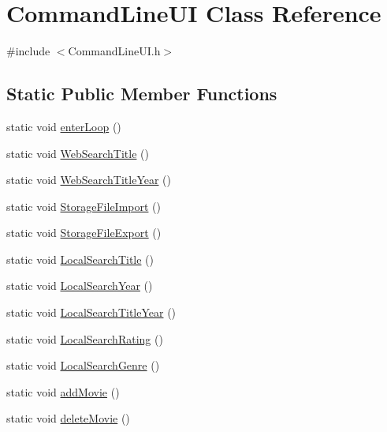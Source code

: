 \hypertarget{class_command_line_u_i}{}\section{Command\+Line\+UI Class Reference}
\label{class_command_line_u_i}


{\ttfamily \#include $<$Command\+Line\+U\+I.\+h$>$}

\subsection*{Static Public Member Functions}
\begin{DoxyCompactItemize}
\item 
static void \hyperlink{class_command_line_u_i_ac72a09121b78bdf1ab1f457795fcf370}{enter\+Loop} ()
\item 
static void \hyperlink{class_command_line_u_i_acddc1d1d643322aa7885e758d9ba0258}{Web\+Search\+Title} ()
\item 
static void \hyperlink{class_command_line_u_i_a9aadc77fe37d190f9a3931c7babac900}{Web\+Search\+Title\+Year} ()
\item 
static void \hyperlink{class_command_line_u_i_a572b2700a11b424ea09e0bc1664e1d01}{Storage\+File\+Import} ()
\item 
static void \hyperlink{class_command_line_u_i_aeec7ed7ef7e0529db92d63c72a2a411d}{Storage\+File\+Export} ()
\item 
static void \hyperlink{class_command_line_u_i_aee2e35a46b0e08c2d63e4e560a2ac42e}{Local\+Search\+Title} ()
\item 
static void \hyperlink{class_command_line_u_i_ab14668a760d1d91fc48bd83779c6393b}{Local\+Search\+Year} ()
\item 
static void \hyperlink{class_command_line_u_i_a3299891a34464ba718fde1a9945c840b}{Local\+Search\+Title\+Year} ()
\item 
static void \hyperlink{class_command_line_u_i_a639c5f0e93c595c5d109a04c623a7176}{Local\+Search\+Rating} ()
\item 
static void \hyperlink{class_command_line_u_i_ad03e1b9cb97bcdebda6f998c962bf63f}{Local\+Search\+Genre} ()
\item 
static void \hyperlink{class_command_line_u_i_a0b3406ff32e6d7140811568985411173}{add\+Movie} ()
\item 
static void \hyperlink{class_command_line_u_i_ac132799949aab15476dcbe20f7ac4c5f}{delete\+Movie} ()
\item 
\mbox{\label{class_command_line_u_i_a0d1ae1b749f33186014d4f32af4309d4}} 

\end{DoxyCompactItemize}

